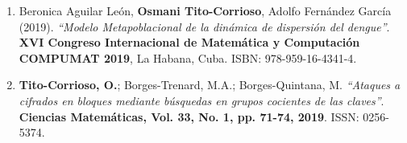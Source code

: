 \begin{enumerate}
	\item  Beronica Aguilar Le\'on, \textbf{Osmani Tito-Corrioso}, Adolfo Fern\'andez Garc\'ia (2019). \textit{``Modelo Metapoblacional de la din\'amica de dispersi\'on del dengue''}. \textbf{XVI Congreso Internacional de Matem\'atica y Computaci\'on COMPUMAT 2019}, La Habana, Cuba. ISBN: 978-959-16-4341-4.
	 \item \textbf{Tito-Corrioso, O.}; Borges-Trenard, M.A.; Borges-Quintana, M. \textit{``Ataques a cifrados en bloques mediante b\'usquedas en grupos cocientes de las claves''}. \textbf{Ciencias Matem\'aticas, Vol. 33, No. 1, pp. 71-74, 2019}. ISSN: 0256-5374.
\end{enumerate}


